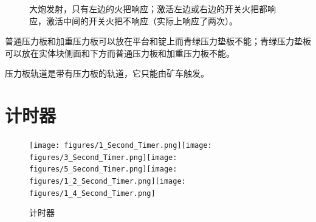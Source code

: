 \begin{figure}[!ht]
\begin{center}
\qquad
{}
\end{center}
\caption{\protect{}大炮发射，只有左边的火把响应；\protect{}激活左边或右边的开关火把都响应，激活中间的开关火把不响应（实际上响应了两次）。}
\label{i209:212}
\end{figure}

普通压力板和加重压力板可以放在平台和锭上而青绿压力垫板不能；青绿压力垫板可以放在实体块侧面和下方而普通压力板和加重压力板不能。

压力板轨道是带有压力板的轨道，它只能由矿车触发。

\section{计时器}
\begin{figure}[!ht]
\centering
\texttt{[image: figures/1\_Second\_Timer.png]}\quad\texttt{[image: figures/3\_Second\_Timer.png]}\quad\texttt{[image: figures/5\_Second\_Timer.png]}\quad\texttt{[image: figures/1\_2\_Second\_Timer.png]}\quad\texttt{[image: figures/1\_4\_Second\_Timer.png]}
\caption{计时器}
\end{figure}

